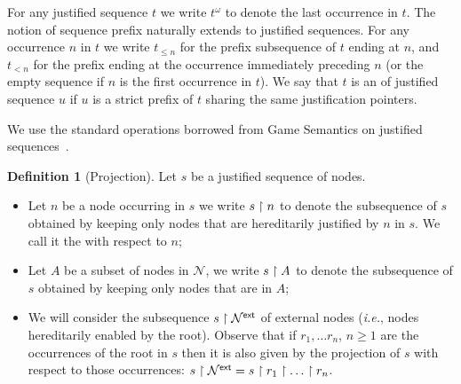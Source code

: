 \documentclass{article}
\makeatletter
\theoremstyle{definition}
\newtheorem{definition}{Definition}[section]
\newcommand\Nodes{\mathcal{N}}%
\newcommand{\ExtNodes}{\Nodes^{\sf ext}}
\renewcommand\ie{{\it i.e.\@\xspace}}
\makeatother
\begin{document}
For any justified sequence $t$ we write $t^\omega$ to denote the last occurrence in $t$. The notion of sequence prefix naturally extends to justified sequences.
For any occurrence $n$ in $t$ we write $t_{\leq n}$ for the prefix subsequence of $t$ ending at $n$, and $t_{<n}$ for the prefix ending at the occurrence immediately preceding $n$ (or the empty sequence if $n$ is the first occurrence in $t$).
 We say that $t$ is an  of justified sequence $u$ if $u$ is a strict prefix of $t$ sharing the same justification pointers.

We use the standard operations borrowed from Game Semantics on justified sequences~\cite{Abr02}.

\begin{definition}[Projection]
Let $s$ be a justified sequence of nodes.

\begin{itemize}
\item Let $n$ be a node occurring in $s$ we write $s\upharpoonright n$ to denote the subsequence of $s$ obtained by keeping only nodes that are hereditarily justified by $n$ in $s$. We call it the  with respect to $n$;

 \item Let $A$ be a subset of nodes in $\Nodes$, we write $s \upharpoonright A$ to denote the subsequence of $s$ obtained by keeping only nodes that are in $A$;

 \item We will consider the subsequence $s\filter\ExtNodes$ of external nodes (\ie, nodes hereditarily enabled by the root). Observe that if $r_1, \ldots r_n$, $n\geq 1$ are the occurrences of the root in $s$ then it is also given by the projection of $s$ with respect to those occurrences: $s\filter\ExtNodes = s\filter r_1 \filter \ldots \filter r_n$.
\end{itemize}
\end{definition}
\end{document}
